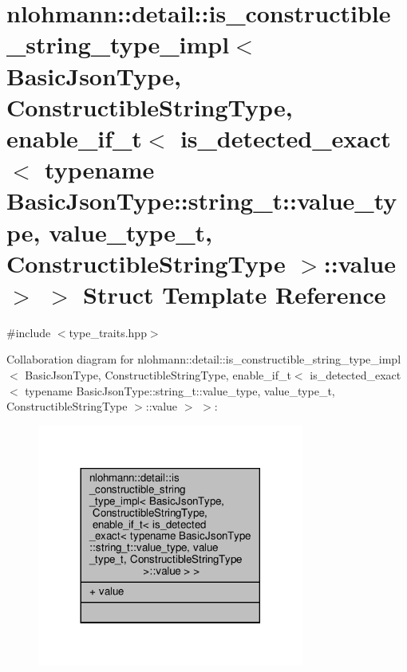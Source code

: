 \hypertarget{structnlohmann_1_1detail_1_1is__constructible__string__type__impl_3_01_basic_json_type_00_01_con83e8ebfe9593f851a60fdb8360df1512}{}\section{nlohmann\+:\+:detail\+:\+:is\+\_\+constructible\+\_\+string\+\_\+type\+\_\+impl$<$ Basic\+Json\+Type, Constructible\+String\+Type, enable\+\_\+if\+\_\+t$<$ is\+\_\+detected\+\_\+exact$<$ typename Basic\+Json\+Type\+:\+:string\+\_\+t\+:\+:value\+\_\+type, value\+\_\+type\+\_\+t, Constructible\+String\+Type $>$\+:\+:value $>$ $>$ Struct Template Reference}
\label{structnlohmann_1_1detail_1_1is__constructible__string__type__impl_3_01_basic_json_type_00_01_con83e8ebfe9593f851a60fdb8360df1512}


{\ttfamily \#include $<$type\+\_\+traits.\+hpp$>$}



Collaboration diagram for nlohmann\+:\+:detail\+:\+:is\+\_\+constructible\+\_\+string\+\_\+type\+\_\+impl$<$ Basic\+Json\+Type, Constructible\+String\+Type, enable\+\_\+if\+\_\+t$<$ is\+\_\+detected\+\_\+exact$<$ typename Basic\+Json\+Type\+:\+:string\+\_\+t\+:\+:value\+\_\+type, value\+\_\+type\+\_\+t, Constructible\+String\+Type $>$\+:\+:value $>$ $>$\+:\nopagebreak
\begin{figure}[H]
\begin{center}
\leavevmode
\includegraphics[width=248pt]{structnlohmann_1_1detail_1_1is__constructible__string__type__impl_3_01_basic_json_type_00_01_con6adf08943039b5ec0403cae63aa95d79}
\end{center}
\end{figure}
